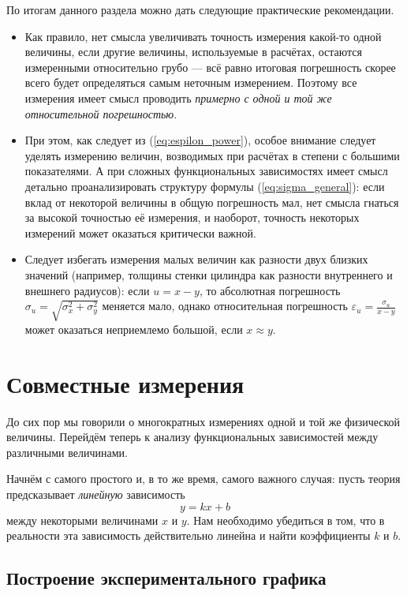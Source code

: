 \documentclass[10pt]{article}
\begin{document}
По итогам данного раздела можно дать следующие практические рекомендации.
\begin{itemize}
\item Как правило, нет смысла увеличивать точность измерения какой-то одной
величины, если другие величины, используемые в расчётах, остаются
измеренными относительно грубо --- всё равно итоговая погрешность
скорее всего будет определяться самым неточным измерением. Поэтому
все измерения имеет смысл проводить \emph{примерно с одной и той же
относительной погрешностью}. 
\item При этом, как следует из (\ref{eq:espilon_power}), особое внимание
следует уделять измерению величин, возводимых при расчётах в степени
с большими показателями. А при сложных функциональных зависимостях
имеет смысл детально проанализировать структуру формулы (\ref{eq:sigma_general}):
если вклад от некоторой величины в общую погрешность мал, нет смысла
гнаться за высокой точностью её измерения, и наоборот, точность некоторых
измерений может оказаться критически важной.
\item Следует избегать измерения малых величин как разности двух близких
значений (например, толщины стенки цилиндра как разности внутреннего
и внешнего радиусов): если $u=x-y$, то абсолютная погрешность $\sigma_{u}=\sqrt{\sigma_{x}^{2}+\sigma_{y}^{2}}$
меняется мало, однако относительная погрешность $\varepsilon_{u}=\frac{\sigma_{u}}{x-y}$
может оказаться неприемлемо большой, если $x\approx y$.
\end{itemize}

\section{Совместные измерения}

До сих пор мы говорили о многократных измерениях одной и той же физической
величины. Перейдём теперь к анализу функциональных зависимостей между
различными величинами. 

Начнём с самого простого и, в то же время, самого важного случая:
пусть теория предсказывает \emph{линейную} зависимость
\[
y=kx+b
\]
между некоторыми величинами $x$ и $y$. Нам необходимо убедиться
в том, что в реальности эта зависимость действительно линейна и найти
коэффициенты $k$ и $b$.

\subsection{Построение экспериментального графика}
\end{document}
